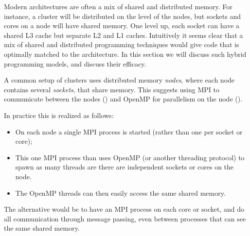 Modern architectures are often a mix of shared and distributed
memory. For instance, a cluster will be distributed on the level of
the nodes, but sockets and cores on a node will have shared
memory. One level up, each socket can have a shared L3 cache but
separate L2 and L1 caches. Intuitively it seems clear that a mix of
shared and distributed programming techniques would give code
that is optimally matched to the architecture. In this section we will
discuss such hybrid programming models, and discuss their efficacy.

A common setup of clusters uses distributed memory
\emph{nodes}, where each node contains several
\emph{sockets}, that share memory. This suggests
using MPI to communicate between the nodes
() and OpenMP for parallelism on
the node ().

In practice this is realized as follows:
\begin{itemize}
\item On each node a single MPI process is started (rather than one
  per socket or core);
\item This one MPI process than uses OpenMP (or another threading
  protocol) to spawn as many threads are there are independent sockets
  or cores on the node.
\item The OpenMP threads can then easily access the same shared memory.
\end{itemize}
The alternative would be to have an MPI process on each core or
socket, and do all communication through message passing, even between
processes that can see the same shared memory.

